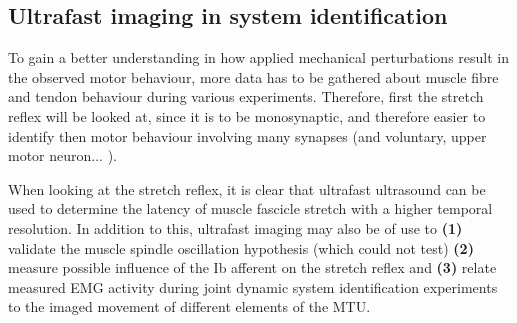 



\subsection{Ultrafast imaging in system identification}
\label{sec:ufus_disc_sys_id}

\tred[draft:] To gain a better understanding in how applied mechanical perturbations result in the observed motor behaviour, more data has to be gathered about muscle fibre and tendon behaviour during various experiments. Therefore, first the stretch reflex will be looked at, since it is \tred[thought] to be monosynaptic, and therefore easier to identify then motor behaviour involving many synapses (and voluntary, upper motor neuron... ). 

When looking at the stretch reflex, it is clear that ultrafast ultrasound can be used to determine the latency of muscle fascicle stretch with a higher temporal resolution. In addition to this, ultrafast imaging may also be of use to \textbf{(1)} validate the muscle spindle oscillation hypothesis (which \citeauthor{cronin_triceps_2015} could not test) \textbf{(2)} measure possible influence of the Ib afferent on the stretch reflex and \textbf{(3)} relate measured EMG activity during joint dynamic system identification experiments to the imaged movement of different elements of the MTU. 

